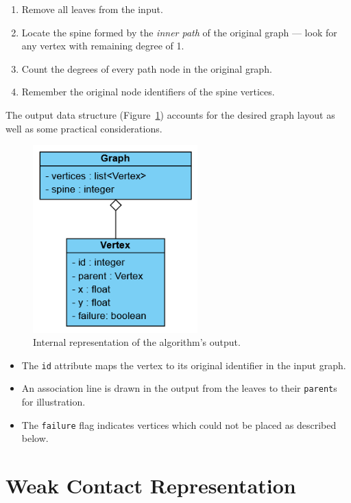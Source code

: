 \documentclass[draft,final]{vutinfth} %
\begin{document}
\begin{enumerate}
    \item Remove all leaves from the input.
    \item Locate the spine formed by the \emph{inner path} of the original graph --- look for any vertex with remaining degree of 1.
    \item Count the degrees of every path node in the original graph.
    \item Remember the original node identifiers of the spine vertices.
\end{enumerate}

The output data structure (Figure~\ref{fig:output_repr}) accounts for the desired graph layout as well as some practical considerations.

\begin{figure}
    \centering
    \includegraphics[width=180pt]{graphics/output_repr.png}
    \caption{Internal representation of the algorithm's output.}
    \label{fig:output_repr}
\end{figure}

\begin{itemize}
    \item The \texttt{id} attribute maps the vertex to its original identifier in the input graph.
    \item An association line is drawn in the output from the leaves to their \texttt{parent}s for illustration.
    \item The \texttt{failure} flag indicates vertices which could not be placed as described below.
\end{itemize}

\section{Weak Contact Representation}
\end{document}
